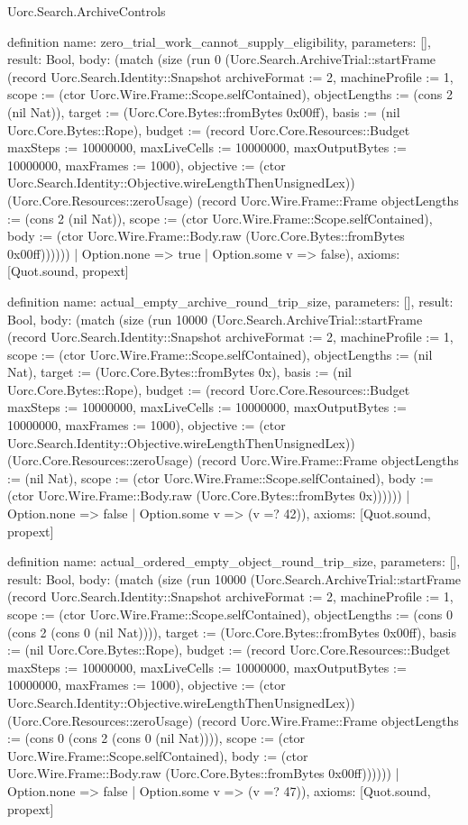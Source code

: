 \begin{lexlean}{Uorc.Search.ArchiveControls}
\begin{semanticmodule}
definition{
  name: zero_trial_work_cannot_supply_eligibility,
  parameters: [],
  result: Bool,
  body: (match (size (run 0 (Uorc.Search.ArchiveTrial::startFrame (record Uorc.Search.Identity::Snapshot {archiveFormat := 2, machineProfile := 1, scope := (ctor Uorc.Wire.Frame::Scope.selfContained), objectLengths := (cons 2 (nil Nat)), target := (Uorc.Core.Bytes::fromBytes 0x00ff), basis := (nil Uorc.Core.Bytes::Rope), budget := (record Uorc.Core.Resources::Budget {maxSteps := 10000000, maxLiveCells := 10000000, maxOutputBytes := 10000000, maxFrames := 1000}), objective := (ctor Uorc.Search.Identity::Objective.wireLengthThenUnsignedLex)}) (Uorc.Core.Resources::zeroUsage) (record Uorc.Wire.Frame::Frame {objectLengths := (cons 2 (nil Nat)), scope := (ctor Uorc.Wire.Frame::Scope.selfContained), body := (ctor Uorc.Wire.Frame::Body.raw (Uorc.Core.Bytes::fromBytes 0x00ff))}))))
    | Option.none => true
    | Option.some v => false),
  axioms: [Quot.sound, propext]
}

definition{
  name: actual_empty_archive_round_trip_size,
  parameters: [],
  result: Bool,
  body: (match (size (run 10000 (Uorc.Search.ArchiveTrial::startFrame (record Uorc.Search.Identity::Snapshot {archiveFormat := 2, machineProfile := 1, scope := (ctor Uorc.Wire.Frame::Scope.selfContained), objectLengths := (nil Nat), target := (Uorc.Core.Bytes::fromBytes 0x), basis := (nil Uorc.Core.Bytes::Rope), budget := (record Uorc.Core.Resources::Budget {maxSteps := 10000000, maxLiveCells := 10000000, maxOutputBytes := 10000000, maxFrames := 1000}), objective := (ctor Uorc.Search.Identity::Objective.wireLengthThenUnsignedLex)}) (Uorc.Core.Resources::zeroUsage) (record Uorc.Wire.Frame::Frame {objectLengths := (nil Nat), scope := (ctor Uorc.Wire.Frame::Scope.selfContained), body := (ctor Uorc.Wire.Frame::Body.raw (Uorc.Core.Bytes::fromBytes 0x))}))))
    | Option.none => false
    | Option.some v => (v =? 42)),
  axioms: [Quot.sound, propext]
}

definition{
  name: actual_ordered_empty_object_round_trip_size,
  parameters: [],
  result: Bool,
  body: (match (size (run 10000 (Uorc.Search.ArchiveTrial::startFrame (record Uorc.Search.Identity::Snapshot {archiveFormat := 2, machineProfile := 1, scope := (ctor Uorc.Wire.Frame::Scope.selfContained), objectLengths := (cons 0 (cons 2 (cons 0 (nil Nat)))), target := (Uorc.Core.Bytes::fromBytes 0x00ff), basis := (nil Uorc.Core.Bytes::Rope), budget := (record Uorc.Core.Resources::Budget {maxSteps := 10000000, maxLiveCells := 10000000, maxOutputBytes := 10000000, maxFrames := 1000}), objective := (ctor Uorc.Search.Identity::Objective.wireLengthThenUnsignedLex)}) (Uorc.Core.Resources::zeroUsage) (record Uorc.Wire.Frame::Frame {objectLengths := (cons 0 (cons 2 (cons 0 (nil Nat)))), scope := (ctor Uorc.Wire.Frame::Scope.selfContained), body := (ctor Uorc.Wire.Frame::Body.raw (Uorc.Core.Bytes::fromBytes 0x00ff))}))))
    | Option.none => false
    | Option.some v => (v =? 47)),
  axioms: [Quot.sound, propext]
}


\end{semanticmodule}
\end{lexlean}

